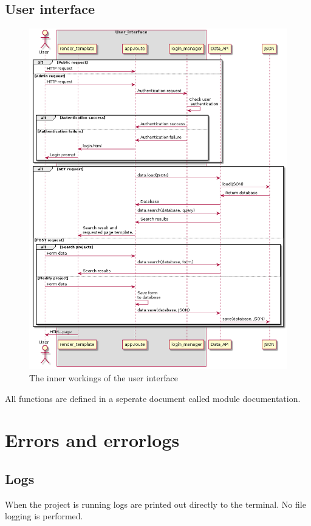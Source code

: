 \documentclass{TDP003mall}
\begin{document}
\subsection{User interface}
\begin{figure}[h!]
    \centering
    \includegraphics[width=14cm]{sekvensdiagram2-3.png}
    \caption{The inner workings of the user interface}
    \label{sekvensdiagram2}
\end{figure}
All functions are defined in a seperate document called module documentation.

\newpage
\section{Errors and errorlogs}
\subsection{Logs}
When the project is running logs are printed out directly to the terminal.
No file logging is performed.
\end{document}
